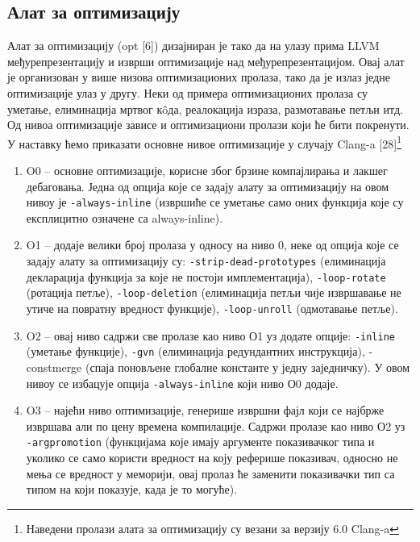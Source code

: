 \documentclass[12pt,oneside]{memoir}
\begin{document}
 \subsection{Алат за оптимизацију}
 Алат за оптимизацију (opt [6]) дизајниран је тако да на улазу прима LLVM
 међурепрезентацију и изврши оптимизације над међурепрезентацијом.
 Овај алат је организован у више низова оптимизационих пролаза, тако да је излаз
 једне оптимизације улаз у другу.
 Неки од примера оптимизационих пролаза су уметање, елиминација мртвог к\^{o}да,
 реалокација израза, размотавање петљи итд. 
 Од нивоа оптимизације зависе и оптимизациони пролази који ће бити покренути.
 У наставку ћемо приказати основне нивое оптимизације у случају Clang-a [28]\footnote{Наведени пролази алата за оптимизацију су везани за верзију 6.0 Clang-a}
 \begin{enumerate}
 \item O0 --  основне оптимизације, корисне због брзине компајлирања и лакшег
 			дебаговања.
 			Једна од опција које се задају алату за оптимизацију  на овом нивоу је
 			\texttt{-always-inline} (извршиће се уметање само оних функција које су експлицитно означене са always-inline).
 \item O1 -- додаје велики број пролаза у односу на ниво 0, неке од опција које
 			се задају алату за оптимизацију су:
           \texttt{-strip-dead-prototypes} (елиминација декларација функција за које не постоји имплементација), \texttt{-loop-rotate} (ротација петље), \texttt{-loop-deletion} (елиминација петљи чије извршавање не утиче на повратну вредност функције), \texttt{-loop-unroll} (одмотавање петље). 
           
 \item O2 -- овај ниво садржи све пролазе као ниво О1 уз додате опције: 
 \texttt{-inline} (уметање функције), \texttt{-gvn} (елиминација редундантних инструкција), -constmerge (спаја поновљене глобалне константе у једну заједничку).
 У овом нивоу се избацује опција \texttt{-always-inline} који ниво О0 додаје.
 \item O3 -- најећи ниво оптимизације, генерише извршни фајл који се најбрже извршава
 	али по цену времена компилације. Садржи пролазе као ниво О2 уз \texttt{-argpromotion} (функцијама које имају аргументе показивачког типа и уколико се само користи вредност
 	на коју реферише показивач, односно не мења се вредност у меморији, овај пролаз ће заменити показивачки тип са типом на који показује, када је то могуће).
 \end{enumerate}
\end{document}
